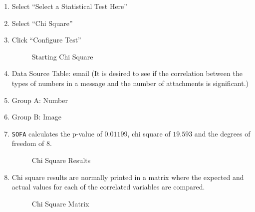 \begin{enumerate}
  \item Select ``Select a Statistical Test Here''
  \item Select ``Chi Square''
  \item Click ``Configure Test''
  
  \begin{figure}[H]
    \begin{center}
      \caption{Starting Chi Square}
    \end{center}
  \end{figure}
  
  \item Data Source Table: email (It is desired to see if the correlation between the types of numbers in a message and the number of attachments is significant.)
  \item Group A: Number
  \item Group B: Image
  \item \texttt{SOFA} calculates the p-value of $ 0.01199 $, chi square of $ 19.593 $ and the degrees of freedom of $ 8 $.

  \begin{figure}[H]
    \begin{center}
      \caption{Chi Square Results}
    \end{center}
  \end{figure}

  \item Chi square results are normally printed in a matrix where the expected and actual values for each of the correlated variables are compared. 

  \begin{figure}[H]
    \begin{center}
      \caption{Chi Square Matrix}
      \label{cor:chi_square_matrix}
    \end{center}
  \end{figure}


\end{enumerate}
